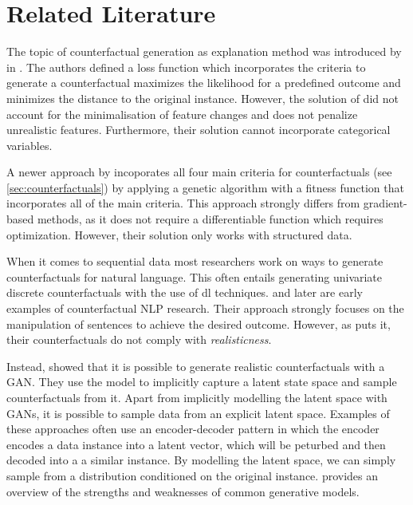 \documentclass[12pt,a4paper]{report}
\begin{document}



\section{Related Literature}
The topic of counterfactual generation as explanation method was introduced by \citeauthor{wachter_CounterfactualExplanationsOpening_2017} in \citeyear{wachter_CounterfactualExplanationsOpening_2017}\needscite. The authors defined a loss function which incorporates the criteria to generate a counterfactual maximizes the likelihood for a predefined outcome and minimizes the distance to the original instance. However, the solution of \citeauthor{wachter_CounterfactualExplanationsOpening_2017} did not account for the minimalisation of feature changes and does not penalize unrealistic features. Furthermore, their solution cannot incorporate categorical variables. 

A newer approach by \citeauthor{dandl_MultiObjectiveCounterfactualExplanations_2020} incoporates all four main criteria for counterfactuals (see \autoref{sec:counterfactuals}) by applying a genetic algorithm with a fitness function that incorporates all of the main criteria\needscite. This approach strongly differs from gradient-based methods, as it does not require a differentiable function which requires optimization. 
However, their solution only works with structured data. 

When it comes to sequential data most researchers work on ways to generate counterfactuals for natural language. This often entails generating univariate discrete counterfactuals with the use of \gls{dl} techniques. \citeauthor{martens_ExplainingDatadrivenDocument_2014} and later \citeauthor{krause_InteractingPredictionsVisual_2016} are early examples of counterfactual NLP research. Their approach strongly focuses on the manipulation of sentences to achieve the desired outcome. However, as \citeauthor{robeer_GeneratingRealisticNatural_2021} puts it, their counterfactuals do not comply with \emph{realisticness}. 

Instead, \citeauthor{robeer_GeneratingRealisticNatural_2021} showed that it is possible to generate realistic counterfactuals with a \gls{GAN}. They use the model to implicitly capture a latent state space and sample counterfactuals from it. Apart from implicitly modelling the latent space with \glspl{GAN}, it is possible to sample data from an explicit latent space. Examples of these approaches often use an encoder-decoder pattern in which the encoder encodes a data instance into a latent vector, which will be peturbed and then decoded into a a similar instance\autocite{melnyk_ImprovedNeuralText_2017}\autocite{wang_ControllableUnsupervisedText_2019}. By modelling the latent space, we can simply sample from a distribution conditioned on the original instance. \citeauthor{bond-taylor_DeepGenerativeModelling_2021} provides an overview of the strengths and weaknesses of common generative models. 
\end{document}
